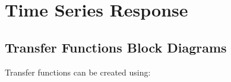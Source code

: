 \documentclass[12pt,letter]{article}
\begin{document}
%	
%	

	\setcounter{section}{3}	
	\setcounter{figure}{0}   
	\renewcommand\thefigure{\thesection.\arabic{figure}}


\section{Time Series Response}

\subsection{Transfer Functions Block Diagrams}


Transfer functions can be created using:
\end{document}
